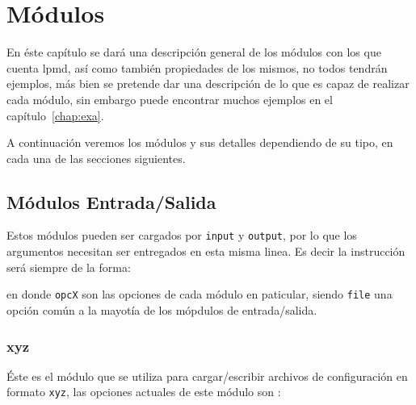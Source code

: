 \chapter{M\'odulos}
\label{chap:modulos}

En \'este cap\'itulo se dar\'a una descripci\'on general de los m\'odulos con los que cuenta lpmd, as\'i como tambi\'en propiedades de los mismos, no todos tendr\'an ejemplos, m\'as bien se pretende dar una descripci\'on de lo que es capaz de realizar cada m\'odulo, sin embargo puede encontrar muchos ejemplos en el cap\'itulo~\ref{chap:exa}.

A continuaci\'on veremos los m\'odulos y sus detalles dependiendo de su tipo, en cada una de las secciones siguientes.

\section{M\'odulos Entrada/Salida}
\label{chap:modulos:entradasalida}
Estos m\'odulos pueden ser cargados por \verb|input| y \verb|output|, por lo que los argumentos necesitan ser entregados en esta misma linea. Es decir la instrucci\'on ser\'a siempre de la forma:


en donde \verb|opcX| son las opciones de cada m\'odulo en paticular, siendo \verb|file| una opci\'on com\'un a la mayot\'ia de los m\'opdulos de entrada/salida.

\subsection{xyz}
\'Este es el m\'odulo que se utiliza para cargar/escribir archivos de configuraci\'on en formato \verb|xyz|, las opciones actuales de este m\'odulo son :


